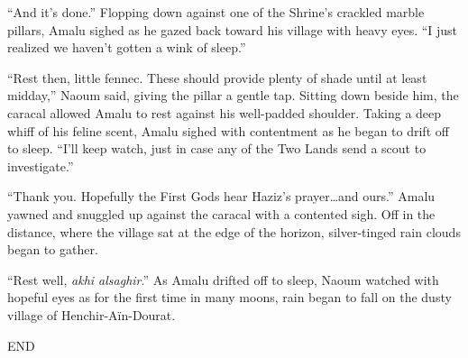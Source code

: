``And it's done.'' Flopping down against one of the Shrine's crackled marble pillars, Amalu sighed as he gazed back toward his village with heavy eyes. ``I just realized we haven't gotten a wink of sleep.''

``Rest then, little fennec. These should provide plenty of shade until at least midday,'' Naoum said, giving the pillar a gentle tap. Sitting down beside him, the caracal allowed Amalu to rest against his well-padded shoulder. Taking a deep whiff of his feline scent, Amalu sighed with contentment as he began to drift off to sleep. ``I'll keep watch, just in case any of the Two Lands send a scout to investigate.''

``Thank you. Hopefully the First Gods hear Haziz's prayer\ldots and ours.'' Amalu yawned and snuggled up against the caracal with a contented sigh. Off in the distance, where the village sat at the edge of the horizon, silver-tinged rain clouds began to gather.

``Rest well, \emph{akhi alsaghir}.'' As Amalu drifted off to sleep, Naoum watched with hopeful eyes as for the first time in many moons, rain began to fall on the dusty village of Henchir-Aïn-Dourat.

END
